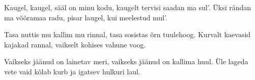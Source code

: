 Kaugel, kaugel, s\"a\"al on minu kodu,
kaugelt tervisi saadan ma sul'.
\"Uksi r\"andan ma v\~o\~oramaa radu,
pisar laugel, kui meelestud mul'.

Tasa nuttis mu kallim mu rinnal,
tasa sosistas \~orn tuulehoog.
Kurvalt kaevasid kajakad rannal,
vaikselt kohises vahune voog.

Vaikseks j\"a\"anud on lainetav meri,
vaikseks j\"a\"anud on kallima huul.
\"Ule lageda vete vaid k\~olab
kurb ja igatsev hulkuri laul.